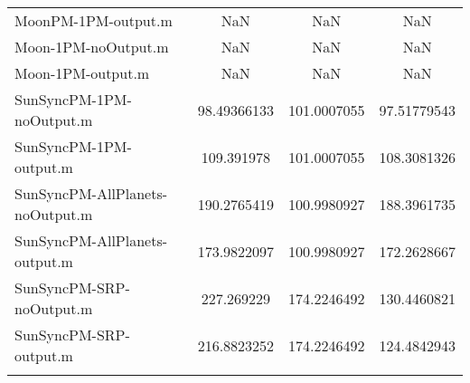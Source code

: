 \begin{table}[htbp!]
\begin{tabular}{lccc}
         MoonPM-1PM-output.m & NaN & NaN & NaN \\
         Moon-1PM-noOutput.m & NaN & NaN & NaN \\
         Moon-1PM-output.m & NaN & NaN & NaN \\
         SunSyncPM-1PM-noOutput.m & 98.49366133 & 101.0007055 & 97.51779543 \\
         SunSyncPM-1PM-output.m & 109.391978 & 101.0007055 & 108.3081326 \\
         SunSyncPM-AllPlanets-noOutput.m & 190.2765419 & 100.9980927 & 188.3961735 \\
         SunSyncPM-AllPlanets-output.m & 173.9822097 & 100.9980927 & 172.2628667 \\
         SunSyncPM-SRP-noOutput.m & 227.269229 & 174.2246492 & 130.4460821 \\
         SunSyncPM-SRP-output.m & 216.8823252 & 174.2246492 & 124.4842943 \\
      \hline\hline
      \label{Table: Performance3-2} 
\end{tabular}
\end{table}

